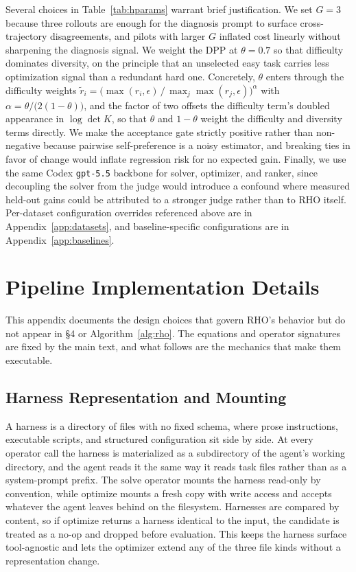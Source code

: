 \documentclass{llmxive}
\providecommand{\method}{\textsc{RHO}}
\begin{document}
Several choices in Table~\ref{tab:hparams} warrant brief justification.
We set $G=3$ because three rollouts are enough for the diagnosis prompt to surface cross-trajectory disagreements, and pilots with larger $G$ inflated cost linearly without sharpening the diagnosis signal.
We weight the DPP at $\theta=0.7$ so that difficulty dominates diversity, on the principle that an unselected easy task carries less optimization signal than a redundant hard one.
Concretely, $\theta$ enters through the difficulty weights $\widetilde{r}_i = \big(\max(r_i,\epsilon)\,/\,\max_j \max(r_j,\epsilon)\big)^{\alpha}$ with $\alpha = \theta/\big(2(1-\theta)\big)$, and the factor of two offsets the difficulty term's doubled appearance in $\log\det K$, so that $\theta$ and $1-\theta$ weight the difficulty and diversity terms directly.
We make the acceptance gate strictly positive rather than non-negative because pairwise self-preference is a noisy estimator, and breaking ties in favor of change would inflate regression risk for no expected gain.
Finally, we use the same Codex \texttt{gpt-5.5} backbone for solver, optimizer, and ranker, since decoupling the solver from the judge would introduce a confound where measured held-out gains could be attributed to a stronger judge rather than to \method{} itself.
Per-dataset configuration overrides referenced above are in Appendix~\ref{app:datasets}, and baseline-specific configurations are in Appendix~\ref{app:baselines}.

\section{Pipeline Implementation Details}\label{app:pipeline}

 This appendix documents the design choices that govern \method{}'s behavior but do not appear in \S 4 or Algorithm~\ref{alg:rho}. The equations and operator signatures are fixed by the main text, and what follows are the mechanics that make them executable.

\subsection{Harness Representation and Mounting}

 A harness is a directory of files with no fixed schema, where prose instructions, executable scripts, and structured configuration sit side by side. At every operator call the harness is materialized as a subdirectory of the agent's working directory, and the agent reads it the same way it reads task files rather than as a system-prompt prefix. The $\mathrm{solve}$ operator mounts the harness read-only by convention, while $\mathrm{optimize}$ mounts a fresh copy with write access and accepts whatever the agent leaves behind on the filesystem. Harnesses are compared by content, so if $\mathrm{optimize}$ returns a harness identical to the input, the candidate is treated as a no-op and dropped before evaluation. This keeps the harness surface tool-agnostic and lets the optimizer extend any of the three file kinds without a representation change.
\end{document}
